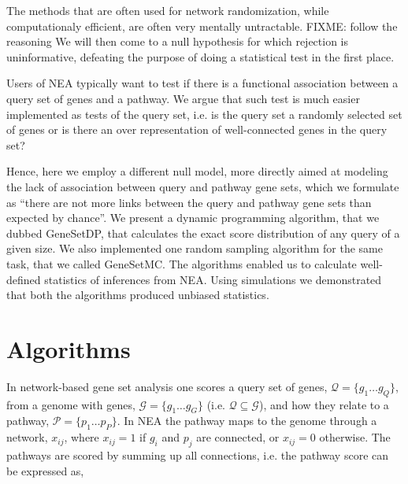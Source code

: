 \documentclass[10pt,letterpaper]{article}
\begin{document}
The methods that are often used for network randomization, while computationaly efficient, are often very mentally untractable. FIXME: follow the reasoning
We will then come to a null hypothesis for which rejection is uninformative, defeating the purpose of doing a statistical test in the first place.

Users of NEA typically want to test if there is a functional association between a query set of genes and a pathway\cite{alexeyenko2012network}. We argue that such test is much easier implemented as tests of the query set, i.e. is the query set a randomly selected set of genes or is there an over representation of well-connected genes in the query set?

Hence, here we employ a different null model, more directly aimed at modeling the lack of association between query and pathway gene sets, which we formulate as ``there are not more links between the query and pathway gene sets than expected by chance''. We present a dynamic programming algorithm, that we dubbed GeneSetDP, that calculates the exact score distribution of any query of a given size. We also implemented one random sampling algorithm for the same task, that we called GeneSetMC.
The algorithms enabled us to calculate well-defined statistics of inferences from NEA.  Using simulations we demonstrated that both the algorithms produced unbiased statistics.

\section*{Algorithms}

In network-based gene set analysis one scores a query set of genes, $ \mathcal{Q}=\{g_1 \ldots g_Q\}$, from a genome with genes, $\mathcal{G}=\{g_1 \ldots g_G\}$ (i.e. $\mathcal{Q} \subseteq \mathcal{G}$), and how they relate to a pathway, $\mathcal{P}=\{p_1 \ldots p_P\}$. In NEA the pathway maps to the genome through a network, ${x_{ij}}$, where $x_{ij}=1$ if $g_i$ and $p_j$ are connected, or $x_{ij}=0$ otherwise. The pathways are scored by summing up all connections, i.e. the pathway score can be expressed as,
\end{document}
